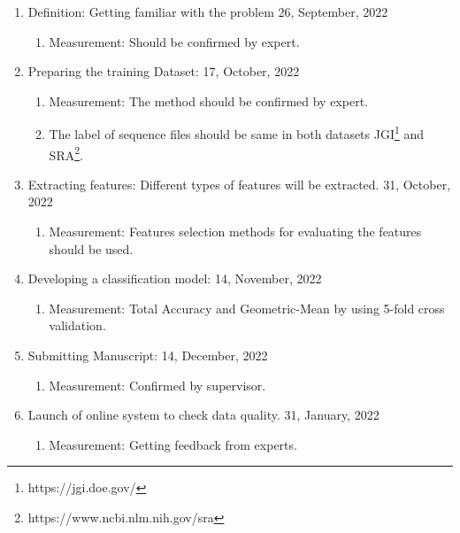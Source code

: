 \documentclass[a4paper]{article}
\newcommand{\deadline}[1]{{\color{blue} \hfill{#1} }}
\begin{document}
    \begin{enumerate}
        \item Definition: Getting familiar with the problem \deadline{26, September, 2022}
        \begin{enumerate}
            \item Measurement: Should be confirmed by expert.
        \end{enumerate}
        \item Preparing the training Dataset:\deadline{17, October, 2022}
        \begin{enumerate}
            \item Measurement: The method should be confirmed by expert.
            \item The label of sequence files should be same in both datasets JGI\footnote{https://jgi.doe.gov/} and SRA\footnote{https://www.ncbi.nlm.nih.gov/sra}.\@
        \end{enumerate}
        \item Extracting features: Different types of features will be extracted. \deadline{31, October, 2022}
        \begin{enumerate}
            \item Measurement: Features selection methods for evaluating the features should be used.
        \end{enumerate}
        \item Developing a classification model: \deadline{14, November, 2022}
        \begin{enumerate}
            \item Measurement: Total Accuracy and Geometric-Mean by using 5-fold cross validation.
        \end{enumerate}
        \item Submitting Manuscript: \deadline{14, December, 2022}
        \begin{enumerate}
            \item Measurement: Confirmed by supervisor.
        \end{enumerate}
        \item Launch of online system to check data quality. \deadline{31, January, 2022}
        \begin{enumerate}
            \item Measurement: Getting feedback from experts.
        \end{enumerate}
    \end{enumerate}
\end{document}
